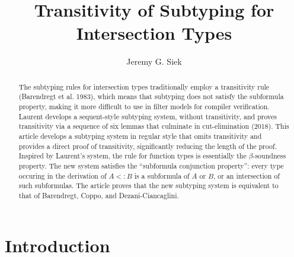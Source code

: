 \documentclass{article}
\title{Transitivity of Subtyping for Intersection Types}
\author{Jeremy G. Siek}
\begin{document}
\maketitle

\newcommand{\TOP}{\ensuremath{\mathtt{U}}}
\newcommand{\dom}[1]{\cap\mathsf{dom}(#1)}
\newcommand{\cod}[1]{\cap\mathsf{cod}(#1)}
\newcommand{\topP}[1]{\mathsf{top}(#1)}
\newcommand{\topInCod}[1]{\mathsf{topInCod}(#1)}
\newcommand{\depth}[1]{\mathsf{depth}(#1)}
\newcommand{\size}[1]{\mathsf{size}(#1)}
\newcommand{\inside}[0]{\inplus}
\newcommand{\containedin}[0]{\subsetpluseq}


\begin{abstract}
  The subtyping rules for intersection types traditionally employ a
  transitivity rule (Barendregt et al. 1983), which means that
  subtyping does not satisfy the subformula property, making it more
  difficult to use in filter models for compiler verification.
  Laurent develops a sequent-style subtyping system, without
  transitivity, and proves transitivity via a sequence of six lemmas
  that culminate in cut-elimination (2018). This article develops a
  subtyping system in regular style that omits transitivity and
  provides a direct proof of transitivity, significantly reducing the
  length of the proof. Inspired by Laurent's system, the rule for
  function types is essentially the $\beta$-soundness property.  The
  new system satisfies the ``subformula conjunction property'': every
  type occuring in the derivation of $A <: B$ is a subformula of $A$
  or $B$, or an intersection of such subformulas. The article proves
  that the new subtyping system is equivalent to that of Barendregt,
  Coppo, and Dezani-Ciancaglini.
\end{abstract}

\section{Introduction}
\end{document}
